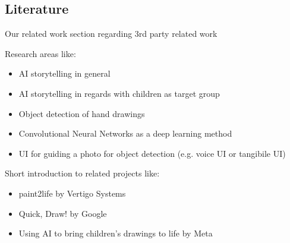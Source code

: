 \subsection{Literature}

Our related work section regarding 3rd party related work

Research areas like:

\begin{itemize}
    \item AI storytelling in general
    \item AI storytelling in regards with children as target group
    \item Object detection of hand drawings
    \item Convolutional Neural Networks as a deep learning method
    \item UI for guiding a photo for object detection (e.g. voice UI or tangibile UI)
\end{itemize}

Short introduction to related projects like:

\begin{itemize}
    \item paint2life by Vertigo Systems
    \item Quick, Draw! by Google
    \item Using AI to bring children's drawings to life by Meta
\end{itemize}
